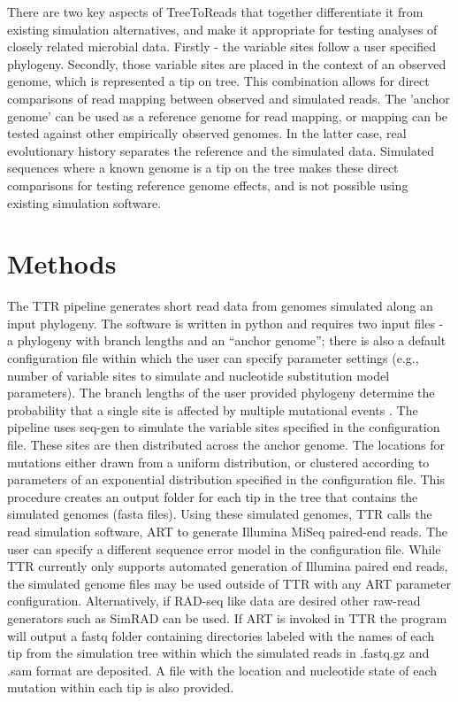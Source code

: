 There are two key aspects of TreeToReads that together differentiate it from existing simulation alternatives, 
and make it appropriate for testing analyses of closely related microbial data.
Firstly - the variable sites follow a user specified phylogeny.
Secondly, those variable sites are placed in the context of an observed genome, which is represented a tip on tree.
This combination allows for direct comparisons of read mapping between observed and simulated reads.
The 'anchor genome' can be used as a reference genome for read mapping, or mapping can be tested against other empirically observed genomes.
In the latter case, real evolutionary history separates the reference and the simulated data.
Simulated sequences where a known genome is a tip on the tree makes these direct comparisons for testing reference genome effects, 
and is not possible using existing simulation software.


\section{Methods}
The TTR pipeline generates short read data from genomes simulated along an input phylogeny. 
The software is written in python and requires two input files - a phylogeny with branch lengths and an “anchor genome”; 
there is also a default configuration file within which the user can specify parameter settings (e.g., number of variable sites to simulate and nucleotide substitution model parameters). 
The branch lengths of the user provided phylogeny determine the probability that a single site is affected by multiple mutational events \citep{sukumaran_dendropy:_2010}.
The pipeline uses seq-gen \citep{rambaut_seq-gen:_1997} to simulate the variable sites specified in the configuration file. 
These sites are then distributed across the anchor genome.
The locations for mutations either drawn from a uniform distribution, 
or clustered according to parameters of an exponential distribution specified in the configuration file. 
This procedure creates an output folder for each tip in the tree that contains the simulated genomes (fasta files). Using these simulated genomes, 
TTR calls the read simulation software, ART \citep{huang_art:_2012} to generate Illumina MiSeq paired-end reads. 
The user can specify a different sequence error model in the configuration file. 
While TTR currently only supports automated generation of Illumina paired end reads, the simulated genome files may be used outside of TTR with any ART parameter configuration. 
Alternatively, if RAD-seq like data are desired other raw-read generators such as SimRAD \citep{lepais_simrad:_2014} can be used. 
If ART is invoked in TTR the program will output a fastq folder containing directories labeled with the names of each tip from the 
simulation tree within which the simulated reads in .fastq.gz and .sam format are deposited. 
A file with the location and nucleotide state of each mutation within each tip is also provided.


